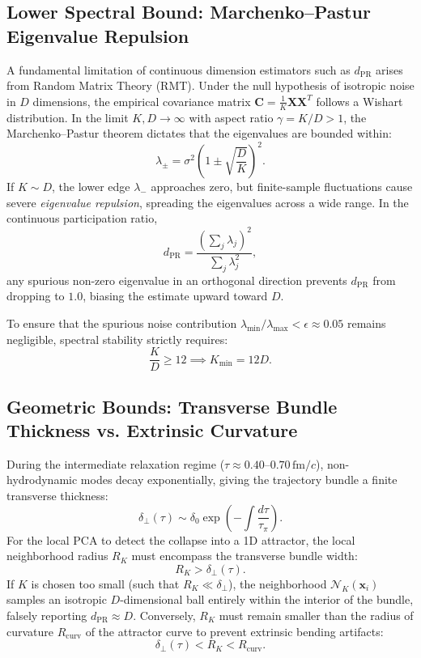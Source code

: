 \documentclass[11pt,a4paper]{article}
\begin{document}
\subsection{Lower Spectral Bound: Marchenko--Pastur Eigenvalue Repulsion}
A fundamental limitation of continuous dimension estimators such as $d_{\mathrm{PR}}$ arises from Random Matrix Theory (RMT). Under the null hypothesis of isotropic noise in $D$ dimensions, the empirical covariance matrix $\mathbf{C} = \frac{1}{K} \mathbf{X} \mathbf{X}^T$ follows a Wishart distribution. In the limit $K, D \to \infty$ with aspect ratio $\gamma = K/D > 1$, the Marchenko--Pastur theorem dictates that the eigenvalues are bounded within:
\begin{equation}
    \lambda_{\pm} = \sigma^2 \left(1 \pm \sqrt{\frac{D}{K}}\right)^2.
\end{equation}
If $K \sim D$, the lower edge $\lambda_-$ approaches zero, but finite-sample fluctuations cause severe \emph{eigenvalue repulsion}, spreading the eigenvalues across a wide range. In the continuous participation ratio,
\begin{equation}
    d_{\mathrm{PR}} = \frac{\left(\sum_j \lambda_j\right)^2}{\sum_j \lambda_j^2},
\end{equation}
any spurious non-zero eigenvalue in an orthogonal direction prevents $d_{\mathrm{PR}}$ from dropping to $1.0$, biasing the estimate upward toward $D$. 

To ensure that the spurious noise contribution $\lambda_{\min}/\lambda_{\max} < \epsilon \approx 0.05$ remains negligible, spectral stability strictly requires:
\begin{equation}
    \frac{K}{D} \ge 12 \implies K_{\min} = 12 D.
\end{equation}

\subsection{Geometric Bounds: Transverse Bundle Thickness vs. Extrinsic Curvature}
During the intermediate relaxation regime ($\tau \approx 0.40$--$0.70\,\mathrm{fm}/c$), non-hydrodynamic modes decay exponentially, giving the trajectory bundle a finite transverse thickness:
\begin{equation}
    \delta_\perp(\tau) \sim \delta_0 \exp\left(-\int \frac{d\tau}{\tau_\pi}\right).
\end{equation}
For the local PCA to detect the collapse into a 1D attractor, the local neighborhood radius $R_K$ must encompass the transverse bundle width:
\begin{equation}
    R_K > \delta_\perp(\tau).
\end{equation}
If $K$ is chosen too small (such that $R_K \ll \delta_\perp$), the neighborhood $\mathcal{N}_K(\mathbf{x}_i)$ samples an isotropic $D$-dimensional ball entirely within the interior of the bundle, falsely reporting $d_{\mathrm{PR}} \approx D$. Conversely, $R_K$ must remain smaller than the radius of curvature $R_{\mathrm{curv}}$ of the attractor curve to prevent extrinsic bending artifacts:
\begin{equation}
    \delta_\perp(\tau) < R_K < R_{\mathrm{curv}}.
\end{equation}
\end{document}
